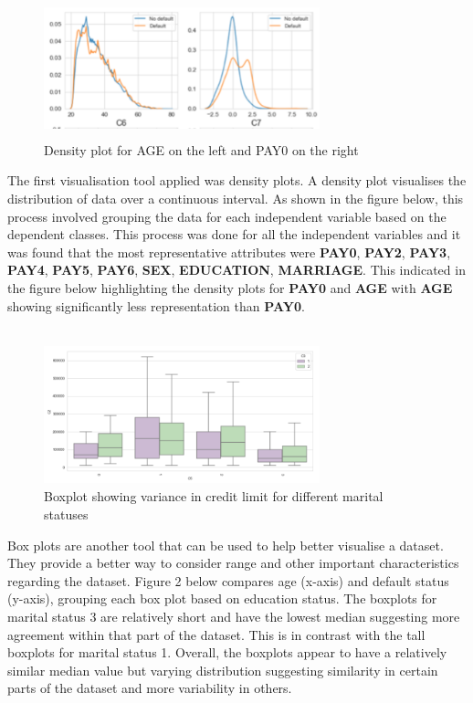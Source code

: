 \documentclass{article}
\begin{document}
\begin{figure}[h]
 \centering
 \includegraphics[width=8cm, height=4cm]{figure1.png}
 \caption{Density plot for AGE on the left and PAY0 on the right}
 \label{fig:figure1}
\end{figure}
The first visualisation tool applied was density plots. A density plot visualises the distribution of data over a continuous interval. As shown in the figure below, this process involved grouping the data for each independent variable based on the dependent classes. This process was done for all the independent variables and it was    found that the most representative attributes were \textbf{PAY0}, \textbf{PAY2}, \textbf{PAY3}, \textbf{PAY4}, \textbf{PAY5}, \textbf{PAY6}, \textbf{SEX}, \textbf{EDUCATION}, \textbf{MARRIAGE}. This indicated in the figure below highlighting the density plots for \textbf{PAY0} and \textbf{AGE} with \textbf{AGE} showing significantly less representation than \textbf{PAY0}. \\ \\
\begin{figure}[h]
 \centering
 \includegraphics[width=8cm, height=4cm]{figure2.png}
 \caption{Boxplot showing variance in credit limit for different marital statuses }
 \label{fig:figure2}
\end{figure}
Box plots are another tool that can be used to help better visualise a dataset. They provide a better way to consider range and other important characteristics regarding the dataset. Figure 2 below compares age (x-axis) and default status (y-axis), grouping each box plot based on education status. The boxplots for marital status 3 are relatively short and have the lowest median suggesting more agreement within that part of the dataset. This is in contrast with the tall boxplots for marital status 1. Overall, the boxplots appear to have a relatively similar median value but varying distribution suggesting similarity in certain parts of the dataset and more variability in others.  \\ \\
\end{document}
